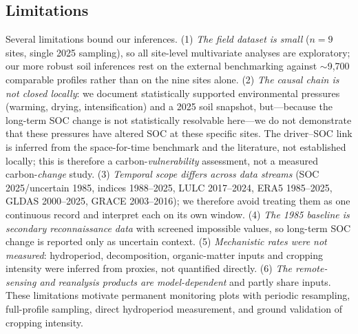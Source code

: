\documentclass[preprint,authoryear,12pt]{elsarticle}
\begin{document}
\subsection{Limitations}
\label{subsec:limitations}
Several limitations bound our inferences. (1) \emph{The field dataset is small} ($n=9$ sites,
single 2025 sampling), so all site-level multivariate analyses are exploratory; our more robust
soil inferences rest on the external benchmarking against $\sim$9{,}700 comparable profiles rather
than on the nine sites alone. (2) \emph{The causal chain is not closed locally}: we document
statistically supported environmental pressures (warming, drying, intensification) and a 2025 soil
snapshot, but---because the long-term SOC change is not statistically resolvable here---we do not
demonstrate that these pressures have altered SOC at these specific sites. The driver--SOC link is
inferred from the space-for-time benchmark and the literature, not established locally; this is
therefore a carbon-\emph{vulnerability} assessment, not a measured carbon-\emph{change} study.
(3) \emph{Temporal scope differs across data streams} (SOC 2025/uncertain 1985, indices
1988--2025, LULC 2017--2024, ERA5 1985--2025, GLDAS 2000--2025, GRACE 2003--2016); we therefore
avoid treating them as one continuous record and interpret each on its own window. (4) \emph{The
1985 baseline is secondary reconnaissance data} with screened impossible values, so long-term SOC
change is reported only as uncertain context. (5) \emph{Mechanistic rates were not measured}:
hydroperiod, decomposition, organic-matter inputs and cropping intensity were inferred from
proxies, not quantified directly. (6) \emph{The remote-sensing and reanalysis products are
model-dependent} and partly share inputs. These limitations motivate permanent monitoring plots
with periodic resampling, full-profile sampling, direct hydroperiod measurement, and ground
validation of cropping intensity.
\end{document}
